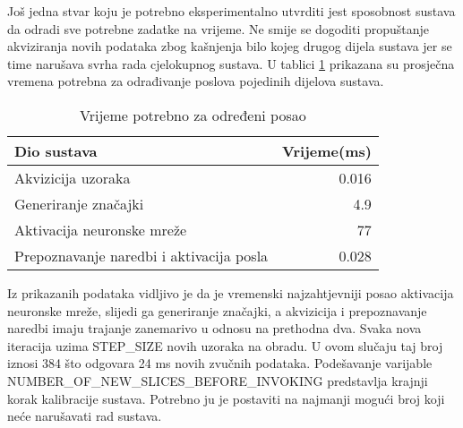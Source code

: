 Još jedna stvar koju je potrebno eksperimentalno utvrditi jest sposobnost sustava da
odradi sve potrebne zadatke na vrijeme. Ne smije se dogoditi propuštanje akviziranja
novih podataka zbog kašnjenja bilo kojeg drugog dijela sustava jer se time narušava
svrha rada cjelokupnog sustava. U tablici \ref{tab:rts} prikazana su prosječna
vremena potrebna za odrađivanje poslova pojedinih dijelova sustava. 

\begin{table}[htb]
    \centering
    \begin{tabular}{|l|r|}
        \hline
        \textbf{Dio sustava} & \textbf{Vrijeme(ms)} \\ \hline
        Akvizicija uzoraka & 0.016\\ \hline
        Generiranje značajki & 4.9 \\ \hline
        Aktivacija neuronske mreže & 77 \\ \hline
        Prepoznavanje naredbi i aktivacija posla & 0.028 \\ \hline
    \end{tabular}
    \caption{Vrijeme potrebno za određeni posao}
    \label{tab:rts}
\end{table}

Iz prikazanih podataka
vidljivo je da je vremenski najzahtjevniji posao aktivacija neuronske mreže, slijedi ga 
generiranje značajki, a akvizicija i prepoznavanje naredbi imaju trajanje zanemarivo u odnosu
na prethodna dva. Svaka nova iteracija uzima STEP\_SIZE novih uzoraka na obradu. U ovom slučaju
taj broj iznosi 384 što odgovara 24 ms novih zvučnih podataka. Podešavanje varijable
NUMBER\_OF\_NEW\_SLICES\_BEFORE\_INVOKING predstavlja krajnji korak kalibracije sustava.
Potrebno ju je postaviti na najmanji mogući broj koji neće narušavati rad sustava.


